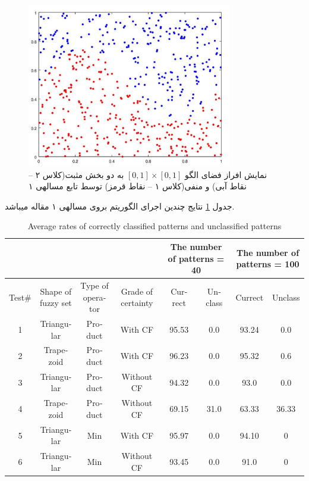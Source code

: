 \documentclass[10pt,a4paper]{article}
\newcommand{\نیمفاصله}{\halfspace}
\renewcommand{\ }{\halfspace}
\begin{document}
\begin{figure}[H]
    \centering
    \includegraphics[width=0.8\textwidth]{problem_1}
    \captionsetup{justification=centering,margin=6em}
    \caption{\footnotesize نمایش افراز فضای الگو
$[0, 1] \times [0, 1]$
به دو بخش مثبت(کلاس ۲ -- نقاط آبی) و منفی(کلاس ۱ -- نقاط قرمز) توسط تابع مساله\ ی ۱    
     }
    \label{fig:problem_1}
\end{figure}
\noindent
جدول
\ref{tab:results}
نتایج چندین اجرای الگوریتم بروی مساله\ ی ۱ مقاله می\ باشد.
\begin{latin}
\begin{table}[h]
    \begin{adjustwidth}{-3em}{}
        \begin{tabular}{ | c | c | c | c | c | c | c | c | }
            \cline{5-8}
            \multicolumn{4}{l}{} & \multicolumn{2}{|p{2.5cm}|}{The number of patterns = 40} & \multicolumn{2}{|p{2.5cm}|}{The number of patterns = 100}\\\hline
            Test\# & Shape of fuzzy set & Type of operator & Grade of certainty & Currect & Unclass & Currect & Unclass\\\hline
			1 & Triangular	& Product	& With CF		& 95.53 & 0.0 & 93.24 & 0.0\\\hline
			2 & Trapezoid	& Product	& With CF		& 96.23 & 0.0 & 95.32 & 0.6\\\hline
			3 & Triangular	& Product	& Without CF	    & 94.32 & 0.0 & 93.0 & 0.0\\\hline
			4 & Trapezoid	& Product	& Without CF	    & 69.15 & 31.0 & 63.33 & 36.33\\\hline
			5 & Triangular	& Min		& With CF		& 95.97 & 0.0 & 94.10 & 0\\\hline
			6 & Triangular	& Min		& Without CF 	& 93.45 & 0.0 & 91.0 & 0\\\hline
        \end{tabular}
        \caption{Average rates of correctly classified patterns and unclassified patterns}
        \label{tab:results}
    \end{adjustwidth}
\end{table}
\end{latin}
\end{document}
